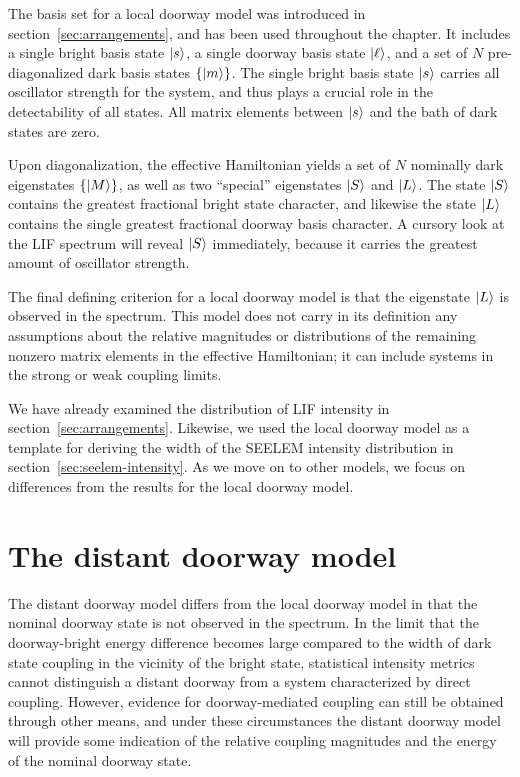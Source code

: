 \documentclass[12pt]{mitthesis}
\begin{document}
The basis set for a local doorway model was introduced in
section~\ref{sec:arrangements}, and has been used throughout the
chapter. It includes a single bright basis state $\mathinner{|{s}\rangle}$, a single
doorway basis state $\mathinner{|{\ell}\rangle}$, and a set of $N$ pre-diagonalized
dark basis states $\lbrace \mathinner{|{m}\rangle} \rbrace$.  The single bright basis
state $\mathinner{|{s}\rangle}$ carries all oscillator strength for the system, and
thus plays a crucial role in the detectability of all states.  All
matrix elements between $\mathinner{|{s}\rangle}$ and the bath of dark states are
zero.

Upon diagonalization, the effective Hamiltonian yields a set of $N$
nominally dark eigenstates $\lbrace \mathinner{|{M}\rangle} \rbrace$, as well as two
``special'' eigenstates $\mathinner{|{S}\rangle}$ and $\mathinner{|{L}\rangle}$.  The state $\mathinner{|{S}\rangle}$
contains the greatest fractional bright state character, and likewise
the state $\mathinner{|{L}\rangle}$ contains the single greatest fractional doorway
basis character.  A cursory look at the LIF spectrum will reveal
$\mathinner{|{S}\rangle}$ immediately, because it carries the greatest amount of
oscillator strength.

The final defining criterion for a local doorway model is that the
eigenstate $\mathinner{|{L}\rangle}$ is observed in the spectrum.  This model does not
carry in its definition any assumptions about the relative magnitudes
or distributions of the remaining nonzero matrix elements in the
effective Hamiltonian; it can include systems in the strong or weak
coupling limits.

We have already examined the distribution of LIF intensity in
section~\ref{sec:arrangements}.  Likewise, we used the local doorway
model as a template for deriving the width of the SEELEM intensity
distribution in section~\ref{sec:seelem-intensity}.  As we move on to
other models, we focus on differences from the results for the local
doorway model.

%

\section{The distant doorway model}
\label{sec:model-distant}

The distant doorway model differs from the local doorway model in that
the nominal doorway state is not observed in the spectrum.  In the
limit that the doorway-bright energy difference becomes large compared
to the width of dark state coupling in the vicinity of the bright
state, statistical intensity metrics cannot distinguish a distant
doorway from a system characterized by direct coupling.  However,
evidence for doorway-mediated coupling can still be obtained through
other means, and under these circumstances the distant doorway model
will provide some indication of the relative coupling magnitudes and
the energy of the nominal doorway state.
\end{document}
